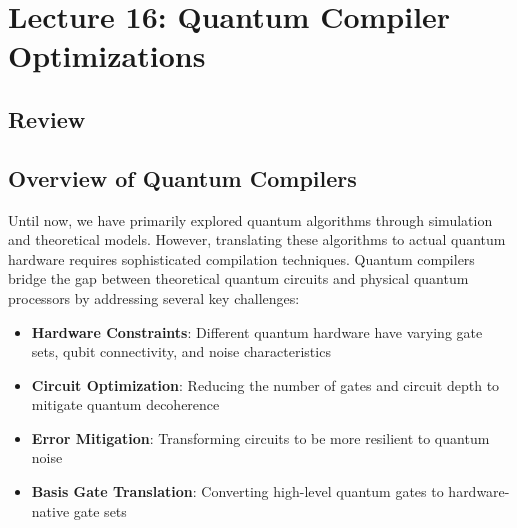 \section{Lecture 16: Quantum Compiler Optimizations}\label{sec:lecture16}

\subsection*{Review}




\subsection*{Overview of Quantum Compilers}

Until now, we have primarily explored quantum algorithms through simulation
and theoretical models. However, translating these algorithms to actual
quantum hardware requires sophisticated compilation techniques. Quantum
compilers bridge the gap between theoretical quantum circuits and physical
quantum processors by addressing several key challenges:

\begin{itemize}
  \item \textbf{Hardware Constraints}: Different quantum hardware have
    varying gate sets, qubit connectivity, and noise characteristics

  \item \textbf{Circuit Optimization}: Reducing the number of gates and
    circuit depth to mitigate quantum decoherence

  \item \textbf{Error Mitigation}: Transforming circuits to be more resilient
    to quantum noise

  \item \textbf{Basis Gate Translation}: Converting high-level quantum gates
    to hardware-native gate sets
\end{itemize}

